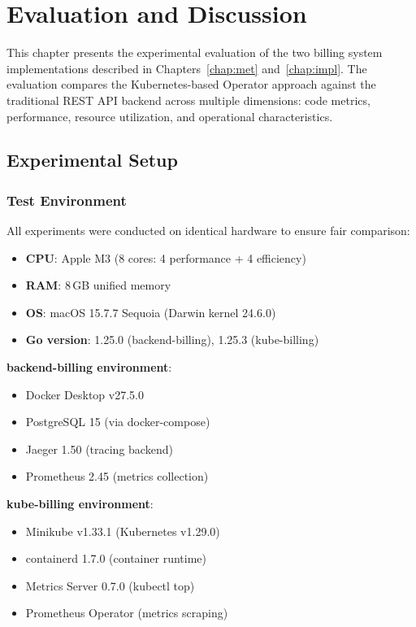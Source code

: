\chapter{Evaluation and Discussion}\label{chap:eval}

This chapter presents the experimental evaluation of the two billing system implementations described in Chapters~\ref{chap:met} and~\ref{chap:impl}. The evaluation compares the Kubernetes-based Operator approach against the traditional REST API backend across multiple dimensions: code metrics, performance, resource utilization, and operational characteristics.

\section{Experimental Setup}

\subsection{Test Environment}

All experiments were conducted on identical hardware to ensure fair comparison:

\begin{itemize}
    \item \textbf{CPU}: Apple M3 (8 cores: 4 performance + 4 efficiency)
    \item \textbf{RAM}: 8\,GB unified memory
    \item \textbf{OS}: macOS 15.7.7 Sequoia (Darwin kernel 24.6.0)
    \item \textbf{Go version}: 1.25.0 (backend-billing), 1.25.3 (kube-billing)
\end{itemize}

\textbf{backend-billing environment}:
\begin{itemize}
    \item Docker Desktop v27.5.0
    \item PostgreSQL 15 (via docker-compose)
    \item Jaeger 1.50 (tracing backend)
    \item Prometheus 2.45 (metrics collection)
\end{itemize}

\textbf{kube-billing environment}:
\begin{itemize}
    \item Minikube v1.33.1 (Kubernetes v1.29.0)
    \item containerd 1.7.0 (container runtime)
    \item Metrics Server 0.7.0 (kubectl top)
    \item Prometheus Operator (metrics scraping)
\end{itemize}

